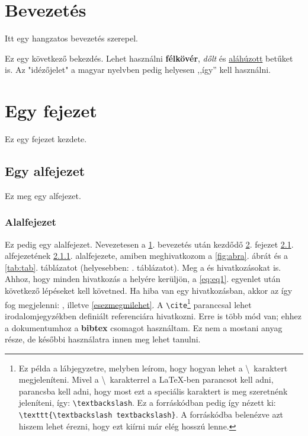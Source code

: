 \documentclass[a4paper, 12pt]{article}
\numberwithin{equation}{section}          %
\numberwithin{figure}{subsection}
\begin{document}
\section{Bevezetés}
\label{sec:bev}
Itt egy hangzatos bevezetés szerepel.

Ez egy következő bekezdés. Lehet használni \textbf{félkövér}, \textit{dőlt} és 
\underline{aláhúzott} betűket is. Az "idézőjelet" a magyar nyelvben pedig helyesen ,,így'' 
kell használni.

\section{Egy fejezet}
\label{sec:fejezet}

Ez egy fejezet kezdete.

\subsection{Egy alfejezet}
\label{subsec:alfejezet}

Ez meg egy alfejezet.

\subsubsection{Alalfejezet}
\label{subsubsec:alalfejezet}

Ez pedig egy alalfejezet. Nevezetesen a \ref{sec:bev}. bevezetés után kezdődő \ref{sec:fejezet}. fejezet \ref{subsec:alfejezet}. alfejezetének \ref{subsubsec:alalfejezet}. alalfejezete, amiben meghivatkozom a \ref{fig:abra}. ábrát és a \ref{tab:tab}. táblázatot (helyesebben: . táblázatot). Meg a \cite{artic:elso} és \cite{artic:masodik, artic:harmadik, artic:negyedik} hivatkozásokat is. Ahhoz, hogy minden hivatkozás a helyére kerüljön, a \ref{eq:eq1}. egyenlet után következő lépéseket kell követned. Ha hiba van egy hivatkozásban, akkor az így fog megjelenni: \cite{ezegynemletezohivatkozas}, illetve \ref{esezmegmilehet}. A \texttt{\textbackslash cite}\footnote{Ez példa a lábjegyzetre, melyben leírom, hogy hogyan lehet a \textbackslash\ karaktert megjeleníteni. Mivel a \textbackslash\ karakterrel a \LaTeX-ben parancsot kell adni, parancsba kell adni, hogy most ezt a speciális karaktert is meg szeretnénk jeleníteni, így: \texttt{\textbackslash textbackslash}. Ez a forráskódban pedig így nézett ki: \texttt{\textbackslash texttt\{\textbackslash textbackslash textbackslash\}}. A forráskódba belenézve azt hiszem lehet érezni, hogy ezt kiírni már elég hosszú lenne.} paranccsal lehet irodalomjegyzékben definiált referenciára hivatkozni. Erre is több mód van; ehhez a dokumentumhoz a \textbf{bibtex} csomagot használtam. Ez nem a mostani anyag része, de későbbi használatra innen meg lehet tanulni.
\end{document}
